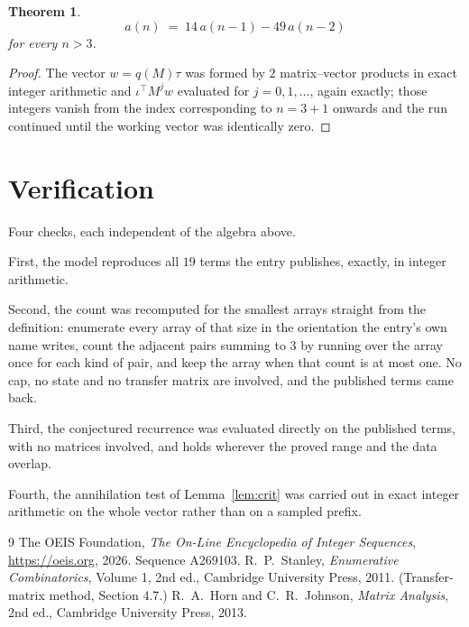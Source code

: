 \documentclass[11pt,a4paper]{article}
\theoremstyle{plain}
\newtheorem{theorem}{Theorem}
\theoremstyle{definition}
\begin{document}
\begin{theorem}
\[
a(n)\;=\;14\,a(n-1) - 49\,a(n-2)
\]
for every $n>3$.
\end{theorem}

\begin{proof}
The vector $w=q(M)\tau$ was formed by $2$ matrix--vector products in exact integer
arithmetic and $\iota^{\!\top}M^{j}w$ evaluated for $j=0,1,\dots$, again exactly; those
integers vanish from the index corresponding to $n=3+1$ onwards and the run continued
until the working vector was identically zero.
\end{proof}

\section{Verification}

Four checks, each independent of the algebra above.

First, the model reproduces all $19$ terms the entry publishes, exactly, in integer
arithmetic.

Second, the count was recomputed for the smallest arrays straight from the definition:
enumerate every array of that size in the orientation the entry's own name writes, count the
adjacent pairs summing to $3$ by running over the array once for each kind of pair, and keep
the array when that count is at most one. No cap, no state and no transfer matrix are involved, and
the published terms came back.

Third, the conjectured recurrence was evaluated directly on the published terms, with no
matrices involved, and holds wherever the proved range and the data overlap.

Fourth, the annihilation test of Lemma~\ref{lem:crit} was carried out in exact integer
arithmetic on the whole vector rather than on a sampled prefix.

\begin{thebibliography}{9}
 The OEIS Foundation, \emph{The On-Line Encyclopedia of Integer
Sequences}, \url{https://oeis.org}, 2026. Sequence A269103.
 R.~P.~Stanley, \emph{Enumerative Combinatorics}, Volume 1, 2nd ed.,
Cambridge University Press, 2011. (Transfer-matrix method, Section 4.7.)
 R.~A.~Horn and C.~R.~Johnson, \emph{Matrix Analysis}, 2nd ed., Cambridge
University Press, 2013.
\end{thebibliography}
\end{document}
